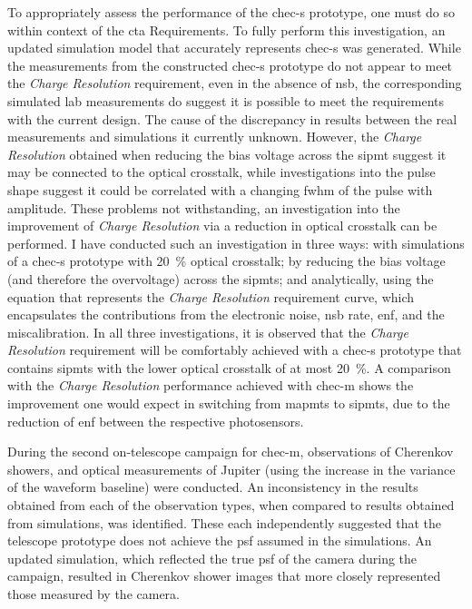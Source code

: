 To appropriately assess the performance of the \gls{chec-s} prototype, one must do so within context of the \gls{cta} Requirements. To fully perform this investigation, an updated simulation model that accurately represents \gls{chec-s} was generated. While the measurements from the constructed \gls{chec-s} prototype do not appear to meet the \textit{Charge Resolution} requirement, even in the absence of \gls{nsb}, the corresponding simulated lab measurements do suggest it is possible to meet the requirements with the current design. The cause of the discrepancy in results between the real measurements and simulations it currently unknown. However, the \textit{Charge Resolution} obtained when reducing the bias voltage across the \gls{sipmt} suggest it may be connected to the optical crosstalk, while investigations into the pulse shape suggest it could be correlated with a changing \gls{fwhm} of the pulse with amplitude. These problems not withstanding, an investigation into the improvement of \textit{Charge Resolution} via a reduction in optical crosstalk can be performed. I have conducted such an investigation in three ways: with simulations of a \gls{chec-s} prototype with \SI{20}{\percent} optical crosstalk; by reducing the bias voltage (and therefore the overvoltage) across the \glspl{sipmt}; and analytically, using the equation that represents the \textit{Charge Resolution} requirement curve, which encapsulates the contributions from the electronic noise, \gls{nsb} rate, \gls{enf}, and the miscalibration. In all three investigations, it is observed that the \textit{Charge Resolution} requirement will be comfortably achieved with a \gls{chec-s} prototype that contains \glspl{sipmt} with the lower optical crosstalk of at most \SI{20}{\percent}. A comparison with the \textit{Charge Resolution} performance achieved with \gls{chec-m} shows the improvement one would expect in switching from \glspl{mapmt} to \glspl{sipmt}, due to the reduction of \gls{enf} between the respective photosensors.

During the second on-telescope campaign for \gls{chec-m}, observations of Cherenkov showers, and optical measurements of Jupiter (using the increase in the variance of the waveform baseline) were conducted. An inconsistency in the results obtained from each of the observation types, when compared to results obtained from simulations, was identified. These each independently suggested that the telescope prototype does not achieve the \gls{psf} assumed in the simulations. An updated simulation, which reflected the true \gls{psf} of the camera during the campaign, resulted in Cherenkov shower images that more closely represented those measured by the camera. 
 

